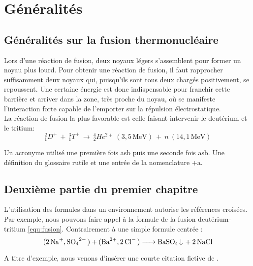\chapter{ Généralités}
\chaptertoc{}

\section{Généralités sur la fusion thermonucléaire}

	Lors d'une réaction de fusion, deux noyaux légers s'assemblent pour former un noyau plus lourd. Pour obtenir une réaction de fusion, il faut rapprocher suffisamment deux noyaux qui, puisqu'ils sont tous deux chargés positivement, se repoussent. Une certaine énergie est donc indispensable pour franchir cette barrière et arriver dans la zone, très proche du noyau, où se manifeste l'interaction forte capable de l'emporter sur la répulsion électrostatique.
	\\ %
	La réaction de fusion la plus favorable est celle faisant intervenir le deutérium et le tritium:
	\begin{equation}
		_{1}^{2}D^{+}~+~_{1}^{3}T^{+}~\rightarrow ~_{2}^{4}He^{2+}~(3,5\,\textrm{MeV})~+~n~(14,1\,\textrm{MeV})
	    \label{equ:fusion}
	\end{equation}

	\noindent %
	\lipsum[2]
	Un acronyme utilisé une première fois \gls{asb} puis une seconde fois \gls{asb}. Une définition du glossaire \gls{rutile} et une entrée de la nomenclature \gls{+a}.

\section{Deuxième partie du premier chapitre}

	\lipsum[2]

	L'utilisation des formules dans un environnement autorise les références croisées. Par exemple, nous pouvons faire appel à la formule de la fusion deutérium-tritium \ref{equ:fusion}. Contrairement à une simple formule centrée :
	$$\ce{(2Na+,SO4^2- ) + (Ba^2+, 2Cl- ) -> BaSO4 v + 2NaCl}$$

	\lipsum[9]

	\begin{displayquote}
	\lipsum[10]
	\end{displayquote}

	A titre d'exemple, nous venons d'insérer une courte citation fictive de \cite{godard_borreliose_2012}.